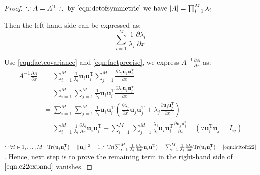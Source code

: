 \begin{proof}
$\because{}A=A^{\mathrm{T}}\therefore{}\text{ by
    \eqref{eqn:detofsymmetric} we have
}\vert{}A\vert{}=\prod_{i=1}^{M}\lambda_{i}$


Then the left-hand side can be expressed as:
\begin{equation}
\sum_{i=1}^{M}\frac{1}{\lambda_i}\frac{\partial{}\lambda_{i}}{\partial{}x}
\label{eqn:leftofc22}
\end{equation}


Use \eqref{eqn:factcovariance} and \eqref{eqn:factprecise}, we
express $A^{-1}\frac{\partial{}A}{\partial{}x}$ as:
\begin{equation}
\begin{split}
A^{-1}\frac{\partial{}A}{\partial{}x}&=\sum_{i=1}^{M}\frac{1}{\lambda_{i}}\mathbf{u}_{i}\mathbf{u}_{i}^{\mathrm{T}}\sum_{j=1}^{M}\frac{\partial{}\lambda_{j}\mathbf{u}_{j}\mathbf{u}_{j}^{\mathrm{T}}}{\partial{}x}\\
&=\sum_{i=1}^{M}\sum_{j=1}^{M}\frac{1}{\lambda_{i}}\mathbf{u}_{i}\mathbf{u}_{i}^{\mathrm{T}}\frac{\partial{}\lambda_{j}\mathbf{u}_{j}\mathbf{u}_{j}^{\mathrm{T}}}{\partial{}x}\\
&=\sum_{i=1}^{M}\sum_{j=1}^{M}\frac{1}{\lambda_{i}}\mathbf{u}_{i}\mathbf{u}_{i}^{\mathrm{T}}(\frac{\partial{}\lambda_{j}}{\partial{}x}\mathbf{u}_{j}\mathbf{u}_{j}^{\mathrm{T}}+\lambda_{j}\frac{\partial{}\mathbf{u}_{j}\mathbf{u}_{j}^{\mathrm{T}}}{\partial{}x})\\
&=\sum_{i=1}^{M}\frac{1}{\lambda_i}\frac{\partial{}\lambda_i}{\partial{}x}\mathbf{u}_{i}\mathbf{u}_{i}^{\mathrm{T}}+\sum_{i=1}^{M}\sum_{j=1}^{M}\frac{\lambda_j}{\lambda_i}\mathbf{u}_{i}\mathbf{u}_{i}^{\mathrm{T}}\frac{\partial{}\mathbf{u}_{j}\mathbf{u}_{j}^{\mathrm{T}}}{\partial{}x}\quad{}(\because{}\mathbf{u}_{i}^{\mathrm{T}}\mathbf{u}_{j}=I_{ij})
\end{split}
\label{eqn:c22expand}
\end{equation}


$\because{}\forall{}i\in{}1,\ldots,M:\text{Tr}(\mathbf{u}_{i}\mathbf{u}_{i}^{\mathrm{T}})=\Vert{}\mathbf{u}_{i}\Vert^{2}=1\therefore{}\text{Tr}(\sum_{i=1}^{M}\frac{1}{\lambda_i}\frac{\partial{}\lambda_i}{\partial{}x}\mathbf{u}_{i}\mathbf{u}_{i}^{\mathrm{T}})=\sum_{i=1}^{M}\frac{1}{\lambda_i}\frac{\partial{}\lambda_i}{\lambda{}x}\text{Tr}(\mathbf{u}_{i}\mathbf{u}_{i}^{\mathrm{T}})=\text{\eqref{eqn:leftofc22}}$.
Hence, next step is to prove the remaining term in the right-hand side
of $\eqref{eqn:c22expand}$ vanishes.



\end{proof}
